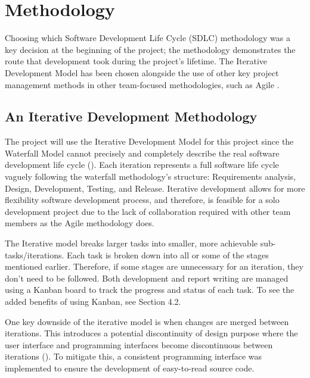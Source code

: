 \chapter{Methodology}
\label{chap:methodology}

Choosing which Software Development Life Cycle (SDLC) methodology was a key decision at the beginning of the project; the methodology demonstrates the route that development took during the project's lifetime. The Iterative Development Model has been chosen alongside the use of other key project management methods in other team-focused methodologies, such as Agile .

\section{An Iterative Development Methodology}
\label{methodology:chosen}

The project will use the Iterative Development Model for this project since the Waterfall Model cannot precisely and completely describe the real software development life cycle (\cite{dapeng_liu_case_2011}).
Each iteration represents a full software life cycle vaguely following the waterfall methodology's structure: Requirements analysis, Design, Development, Testing, and Release. Iterative development allows for more flexibility software development process, and therefore, is feasible for a solo development project due to the lack of collaboration required with other team members as the Agile methodology does.

The Iterative model breaks larger tasks into smaller, more achievable sub-tasks/iterations. Each task is broken down into all or some of the stages mentioned earlier. Therefore, if some stages are unnecessary for an iteration, they don't need to be followed. Both development and report writing are managed using a Kanban board to track the progress and status of each task. To see the added benefits of using Kanban, see Section 4.2.

One key downside of the iterative model is when changes are merged between iterations. This introduces a potential discontinuity of design purpose where the user interface and programming interfaces become discontinuous between iterations (\cite{dapeng_liu_case_2011}). To mitigate this, a consistent programming interface was implemented to ensure the development of easy-to-read source code.